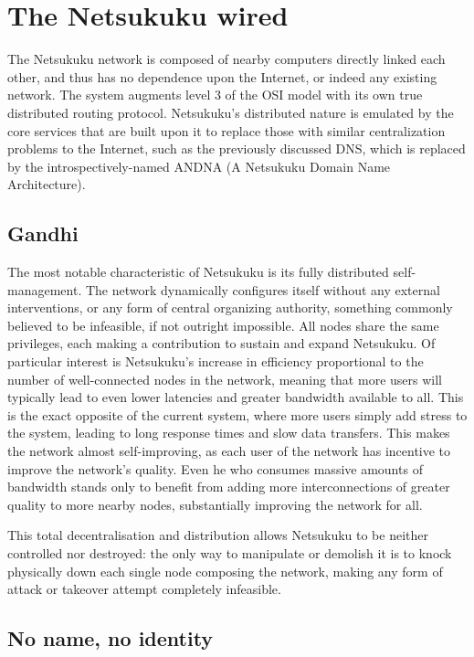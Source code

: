 \documentclass[a4paper]{article}
\begin{document}
\section{The Netsukuku wired}

The Netsukuku network is composed of nearby computers directly linked each other, 
and thus has no dependence upon the Internet, or indeed any existing network.
The system augments level 3 of the OSI model with its own true distributed routing protocol.
Netsukuku's distributed nature is emulated by the core services that are built upon 
it to replace those with similar centralization problems to the Internet, such as
the previously discussed DNS, which is replaced by the introspectively-named 
ANDNA (A Netsukuku Domain Name Architecture)\cite{andnadoc}.

\subsection{Gandhi}

The most notable characteristic of Netsukuku is its fully distributed self-management.
The network dynamically configures itself without any external interventions, or any 
form of central organizing authority, something commonly believed to be infeasible,
if not outright impossible.  
All nodes share the same privileges, each making a contribution to sustain and expand
Netsukuku.
Of particular interest is Netsukuku's increase in efficiency proportional to the 
number of well-connected nodes in the network, meaning that more users will typically
lead to even lower latencies and greater bandwidth available to all.
This is the exact opposite of the current system, where more users simply add stress 
to the system, leading to long response times and slow data transfers.  
This makes the network almost self-improving, as each user of the network has incentive
to improve the network's quality.  Even he who consumes massive amounts of bandwidth
stands only to benefit from adding more interconnections of greater quality to more
nearby nodes, substantially improving the network for all.

This total decentralisation and distribution allows Netsukuku to be neither controlled
nor destroyed: the only way to manipulate or demolish it is to knock physically down 
each single node composing the network, making any form of attack or takeover attempt
completely infeasible.

\subsection{No name, no identity}
\end{document}
